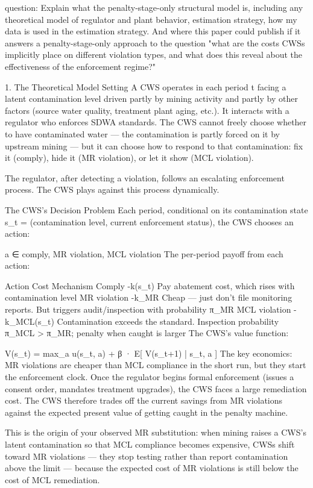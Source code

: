 question: Explain what the penalty-stage-only structural model is, including any theoretical model of regulator and plant behavior, estimation strategy, how my data is used in the estimation strategy. And where this paper could publish if it answers a penalty-stage-only approach to the question "what are the costs CWSs implicitly place on different violation types, and what does this reveal about the effectiveness of the enforcement regime?"

1. The Theoretical Model
Setting
A CWS operates in each period t facing a latent contamination level driven partly by mining activity and partly by other factors (source water quality, treatment plant aging, etc.). It interacts with a regulator who enforces SDWA standards. The CWS cannot freely choose whether to have contaminated water — the contamination is partly forced on it by upstream mining — but it can choose how to respond to that contamination: fix it (comply), hide it (MR violation), or let it show (MCL violation).

The regulator, after detecting a violation, follows an escalating enforcement process. The CWS plays against this process dynamically.

The CWS's Decision Problem
Each period, conditional on its contamination state s_t = (contamination level, current enforcement status), the CWS chooses an action:


a ∈ { comply, MR violation, MCL violation }
The per-period payoff from each action:

Action	Cost	Mechanism
Comply	-k(s_t)	Pay abatement cost, which rises with contamination level
MR violation	-k_MR	Cheap — just don't file monitoring reports. But triggers audit/inspection with probability π_MR
MCL violation	-k_MCL(s_t)	Contamination exceeds the standard. Inspection probability π_MCL > π_MR; penalty when caught is larger
The CWS's value function:


V(s_t) = max_{a} { u(s_t, a) + β · E[ V(s_{t+1}) | s_t, a ] }
The key economics: MR violations are cheaper than MCL compliance in the short run, but they start the enforcement clock. Once the regulator begins formal enforcement (issues a consent order, mandates treatment upgrades), the CWS faces a large remediation cost. The CWS therefore trades off the current savings from MR violations against the expected present value of getting caught in the penalty machine.

This is the origin of your observed MR substitution: when mining raises a CWS's latent contamination so that MCL compliance becomes expensive, CWSs shift toward MR violations — they stop testing rather than report contamination above the limit — because the expected cost of MR violations is still below the cost of MCL remediation.

